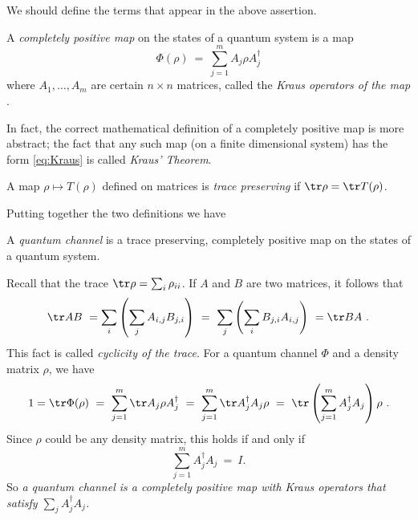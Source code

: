 \documentclass[12pt]{amsart}
\numberwithin{equation}{section}
\numberwithin{figure}{section}
\theoremstyle{theorem}
\begin{document}
We should define the terms that appear in the above assertion.
\begin{defn} A \emph{completely positive map} on the states of a quantum system 
is a map 
	\begin{equation}\label{eq:Kraus}
		\Phi(\rho) \ = \ \sum_{j=1}^m A_j \rho A_j^\dagger
	\end{equation}
	where $A_1,\ldots,A_m$ are certain $n\times n$ matrices, called the 
	\emph{Kraus operators of the map} .
	\end{defn}
In fact, the correct mathematical definition of a completely positive map is 
 more abstract;  the fact that any such map  (on a finite dimensional 
system) has the form \eqref{eq:Kraus} is called \emph{Kraus' Theorem}.  
\begin{defn}  A map $\rho \mapsto T(\rho)$ defined on matrices is \emph{trace 
preserving} if $\tr \rho = \tr T(\rho)$.
	\end{defn}
Putting together the two definitions we have
\begin{defn} A \emph{quantum channel} is a trace preserving, completely 
positive map on the states of a quantum system.
	\end{defn}

Recall that the trace $\tr \rho = \sum_i \rho_{ii}$.  If $A$ and $B$ are two 
matrices, it follows that
\begin{equation}\label{eq:cyclicity}
	\tr A B \ = \sum_{i}\left(\sum_j A_{i,j}B_{j,i}\right) \ = \ \sum_j 
	\left(\sum_i B_{j,i}A_{i,j}\right) \ = \tr B A \ .
\end{equation}
This fact is called \emph{cyclicity of the trace}.  For a quantum channel 
$\Phi$ and a density matrix $\rho$, we have
$$1 = \tr \Phi(\rho) \ = \ \sum_{j=1}^m \tr A_j\rho A_j^\dagger \ = \ 
\sum_{j=1}^m \tr A_j^\dagger A_j \rho \ = \ \tr \left(\sum_{j=1}^m A_j^\dagger 
A_j \right) \rho \ . $$
Since $\rho$ could be any density matrix, this holds if and only if 
$$\sum_{j=1}^m A_j^\dagger A_j \ = \ I .$$
So \emph{a quantum channel is a completely positive map with Kraus operators 
that satisfy $\sum_j A_j^\dagger A_j$.}
\end{document}
